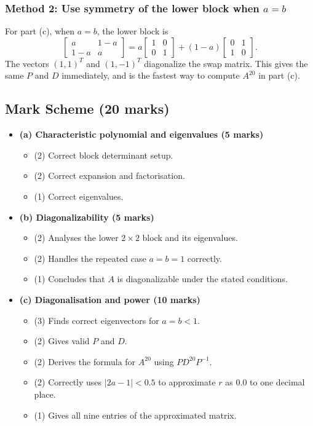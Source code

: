 \documentclass[12pt]{article}
\begin{document}
\subsubsection{Method 2: Use symmetry of the lower block when $a=b$}
For part (c), when $a=b$, the lower block is
\[
\begin{bmatrix}a&1-a\\1-a&a\end{bmatrix}
=a\begin{bmatrix}1&0\\0&1\end{bmatrix}+(1-a)\begin{bmatrix}0&1\\1&0\end{bmatrix}.
\]
The vectors $(1,1)^T$ and $(1,-1)^T$ diagonalize the swap matrix. This gives the same $P$ and $D$ immediately, and is the fastest way to compute $A^{20}$ in part (c).

\subsection{Mark Scheme (20 marks)}
\begin{itemize}[leftmargin=1.6em]
  \item \textbf{(a) Characteristic polynomial and eigenvalues (5 marks)}
  \begin{itemize}[leftmargin=1.6em]
    \item (2) Correct block determinant setup.
    \item (2) Correct expansion and factorisation.
    \item (1) Correct eigenvalues.
  \end{itemize}
  \item \textbf{(b) Diagonalizability (5 marks)}
  \begin{itemize}[leftmargin=1.6em]
    \item (2) Analyses the lower $2\times2$ block and its eigenvalues.
    \item (2) Handles the repeated case $a=b=1$ correctly.
    \item (1) Concludes that $A$ is diagonalizable under the stated conditions.
  \end{itemize}
  \item \textbf{(c) Diagonalisation and power (10 marks)}
  \begin{itemize}[leftmargin=1.6em]
    \item (3) Finds correct eigenvectors for $a=b<1$.
    \item (2) Gives valid $P$ and $D$.
    \item (2) Derives the formula for $A^{20}$ using $PD^{20}P^{-1}$.
    \item (2) Correctly uses $|2a-1|<0.5$ to approximate $r$ as $0.0$ to one decimal place.
    \item (1) Gives all nine entries of the approximated matrix.
  \end{itemize}
\end{itemize}
\end{document}
